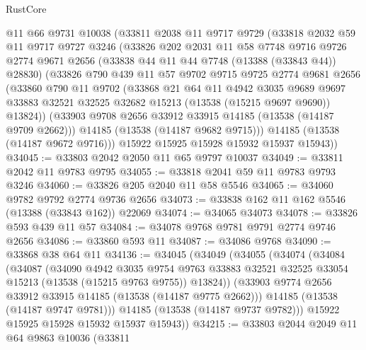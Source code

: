 \begin{lexlean}{RustCore}
\begin{coremodule}
    @11
    @66
    @9731
    @10038
    (@33811
      @2038
      @11
      @9717
      @9729
      (@33818
        @2032
        @59
        @11
        @9717
        @9727
        @3246
        (@33826
          @202
          @2031
          @11
          @58
          @7748
          @9716
          @9726
          @2774
          @9671
          @2656
          (@33838 @44 @11 @44 @7748 (@13388 (@33843 @44)) @28830)
          (@33826
            @790
            @439
            @11
            @57
            @9702
            @9715
            @9725
            @2774
            @9681
            @2656
            (@33860
              @790
              @11
              @9702
              (@33868
                @21
                @64
                @11
                @4942
                @3035
                @9689
                @9697
                @33883
                @32521
                @32525
                @32682
                @15213
                (@13538 (@15215 @9697 @9690))
                @13824))
            (@33903 @9708 @2656 @33912 @33915 @14185 (@13538 (@14187 @9709 @2662)))
            @14185
            (@13538 (@14187 @9682 @9715)))
          @14185
          (@13538 (@14187 @9672 @9716)))
        @15922
        @15925
        @15928
        @15932
        @15937
        @15943))
@34045 := @33803 @2042 @2050 @11 @65 @9797 @10037
@34049 := @33811 @2042 @11 @9783 @9795
@34055 := @33818 @2041 @59 @11 @9783 @9793 @3246
@34060 := @33826 @205 @2040 @11 @58 @5546
@34065 := @34060 @9782 @9792 @2774 @9736 @2656
@34073 := @33838 @162 @11 @162 @5546 (@13388 (@33843 @162)) @22069
@34074 := @34065 @34073
@34078 := @33826 @593 @439 @11 @57
@34084 := @34078 @9768 @9781 @9791 @2774 @9746 @2656
@34086 := @33860 @593 @11
@34087 := @34086 @9768
@34090 := @33868 @38 @64 @11
@34136 := @34045
    (@34049
      (@34055
        (@34074
          (@34084
            (@34087
              (@34090
                @4942
                @3035
                @9754
                @9763
                @33883
                @32521
                @32525
                @33054
                @15213
                (@13538 (@15215 @9763 @9755))
                @13824))
            (@33903 @9774 @2656 @33912 @33915 @14185 (@13538 (@14187 @9775 @2662)))
            @14185
            (@13538 (@14187 @9747 @9781)))
          @14185
          (@13538 (@14187 @9737 @9782)))
        @15922
        @15925
        @15928
        @15932
        @15937
        @15943))
@34215 := @33803
    @2044
    @2049
    @11
    @64
    @9863
    @10036
    (@33811

\end{coremodule}
\end{lexlean}
